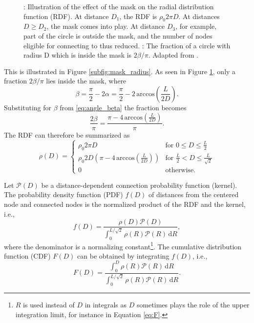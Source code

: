 \begin{figure}[h]
\begin{subfigure}[b]{0.49\textwidth}
    \label{subfig:mask_angles}
\end{subfigure}
\caption[The effect of the mask on the radial distribution function]{: Illustration of the effect of the mask on the radial distribution function (RDF). At distance $D_1$, the RDF is $\rho_0 2\pi D$. At distances $D \ge D_2$, the mask comes into play. At distance $D_3$, for example, part of the circle is outside the mask, and the number of nodes eligible for connecting to thus reduced. : The fraction of a circle with radius D which is inside the mask is $2\beta/\pi$. Adapted from .}
\label{fig:masks}
\end{figure} 
This is illustrated in Figure \ref{subfig:mask_radius}. As seen in Figure \ref{subfig:mask_angles}, only a fraction $2\beta/\pi$ lies inside the mask, where
\begin{equation}\label{eq:angle_beta}
\beta = \frac{\pi}{2} - 2 \alpha = \frac{\pi}{2} - 2 \, \text{arccos}\left( \frac{L}{2D} \right).
\end{equation}
Substituting for $\beta$ from \ref{eq:angle_beta} the fraction becomes
\begin{equation}
\frac{2\beta}{\pi} = \frac{\pi - 4 \, \text{arccos}\left( \frac{L}{2D} \right)}{\pi} .
\end{equation}
The RDF can therefore be summarized as
\begin{equation}
\rho(D) = 
\begin{cases}
   \rho_0 2 \pi D   &   \text{for } 0 \le D \le \frac{L}{2} \\ 
   \rho_0 2 D \left( \pi - 4 \, \text{arccos}\left( \frac{L}{2D} \right)\right)   &   \text{for } \frac{L}{2} < D \le \frac{L}{\sqrt{2}} \\
   0 & \text{otherwise}.
\end{cases}
\end{equation}

Let $\mathcal{P}(D)\label{eq:kernel}$ be a distance-dependent connection probability function (kernel). The probability density function (PDF) $f(D)$ of distances from the centered node and connected nodes is the normalized product of the RDF and the kernel, i.e., 
\begin{equation}\label{eq:f}
f(D) = \frac{\rho(D) \mathcal{P}(D)}   {\int_0^{L/\sqrt{2}}{ \rho(R) \mathcal{P}(R) \, \mathrm{d}R}},
\end{equation}
where the denominator is a normalizing constant\footnote{$R$ is used instead of $D$ in integrals as $D$ sometimes plays the role of the upper integration limit, for instance in Equation \ref{eq:F}.}.
The cumulative distribution function (CDF) $F(D)\label{eq:F}$ can be obtained by integrating $f(D)$, i.e.,
\begin{equation}\label{eq:F}
F(D) = \frac{\int_0^D \rho(R) \mathcal{P}(R) \, \mathrm{d}R}   {\int_0^{L/\sqrt{2}} \rho(R) \mathcal{P}(R) \, \mathrm{d}R}.
\end{equation}

